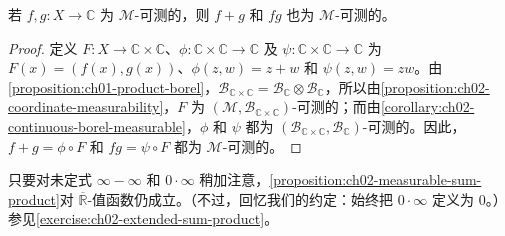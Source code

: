 \documentclass[../../main.tex]{subfiles}%
\begin{document}
\begin{proposition}\label{proposition:ch02-measurable-sum-product}
若 $f,g:X\to\mathbb{C}$ 为 $\mathscr{M}$-可测的，则 $f+g$ 和 $fg$ 也为 $\mathscr{M}$-可测的。
\end{proposition}
\begin{proof}
定义 $F:X\to\mathbb{C}\times\mathbb{C}$、$\phi:\mathbb{C}\times\mathbb{C}\to\mathbb{C}$ 及 $\psi:\mathbb{C}\times\mathbb{C}\to\mathbb{C}$ 为 $F(x)=(f(x),g(x))$、$\phi(z,w)=z+w$ 和 $\psi(z,w)=zw$。由\cref{proposition:ch01-product-borel}，$\mathscr{B}_{\mathbb{C}\times\mathbb{C}}=\mathscr{B}_{\mathbb{C}}\otimes\mathscr{B}_{\mathbb{C}}$，所以由\cref{proposition:ch02-coordinate-measurability}，$F$ 为 $(\mathscr{M},\mathscr{B}_{\mathbb{C}\times\mathbb{C}})$-可测的；而由\cref{corollary:ch02-continuous-borel-measurable}，$\phi$ 和 $\psi$ 都为 $(\mathscr{B}_{\mathbb{C}\times\mathbb{C}},\mathscr{B}_{\mathbb{C}})$-可测的。因此，$f+g=\phi\circ F$ 和 $fg=\psi\circ F$ 都为 $\mathscr{M}$-可测的。
\end{proof}

\begin{remark}
只要对未定式 $\infty-\infty$ 和 $0\cdot\infty$ 稍加注意，\cref{proposition:ch02-measurable-sum-product}对 $\overline{\mathbb{R}}$-值函数仍成立。（不过，回忆我们的约定：始终把 $0\cdot\infty$ 定义为 $0$。）参见\cref{exercise:ch02-extended-sum-product}。
\end{remark}
\end{document}
